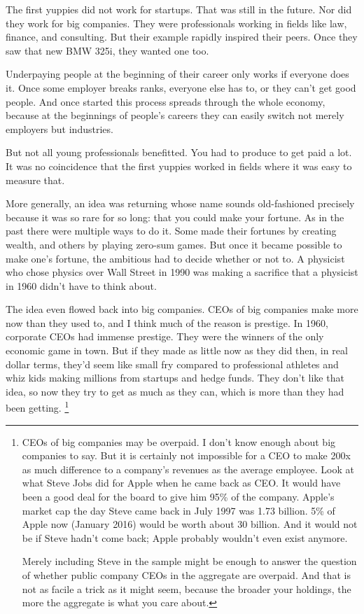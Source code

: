 The first yuppies did not work for startups. That was still in the
future. Nor did they work for big companies. They were professionals
working in fields like law, finance, and consulting. But their example
rapidly inspired their peers. Once they saw that new BMW 325i, they
wanted one too.

Underpaying people at the beginning of their career only works if
everyone does it. Once some employer breaks ranks, everyone else has to,
or they can't get good people. And once started this process spreads
through the whole economy, because at the beginnings of people's careers
they can easily switch not merely employers but industries.

But not all young professionals benefitted. You had to produce to get
paid a lot. It was no coincidence that the first yuppies worked in
fields where it was easy to measure that.

More generally, an idea was returning whose name sounds old-fashioned
precisely because it was so rare for so long: that you could make your
fortune. As in the past there were multiple ways to do it. Some made
their fortunes by creating wealth, and others by playing zero-sum games.
But once it became possible to make one's fortune, the ambitious had to
decide whether or not to. A physicist who chose physics over Wall Street
in 1990 was making a sacrifice that a physicist in 1960 didn't have to
think about.

The idea even flowed back into big companies. CEOs of big companies make
more now than they used to, and I think much of the reason is prestige.
In 1960, corporate CEOs had immense prestige. They were the winners of
the only economic game in town. But if they made as little now as they
did then, in real dollar terms, they'd seem like small fry compared to
professional athletes and whiz kids making millions from startups and
hedge funds. They don't like that idea, so now they try to get as much
as they can, which is more than they had been getting.
\footnote{CEOs of big companies may be overpaid. I don't know enough
about big companies to say. But it is certainly not impossible for a CEO
to make 200x as much difference to a company's revenues as the average
employee. Look at what Steve Jobs did for Apple when he came back as
CEO. It would have been a good deal for the board to give him 95\% of
the company. Apple's market cap the day Steve came back in July 1997 was
1.73 billion. 5\% of Apple now (January 2016) would be worth about 30
billion. And it would not be if Steve hadn't come back; Apple probably
wouldn't even exist anymore.

Merely including Steve in the sample might be enough to answer the
question of whether public company CEOs in the aggregate are overpaid.
And that is not as facile a trick as it might seem, because the broader
your holdings, the more the aggregate is what you care about.}

